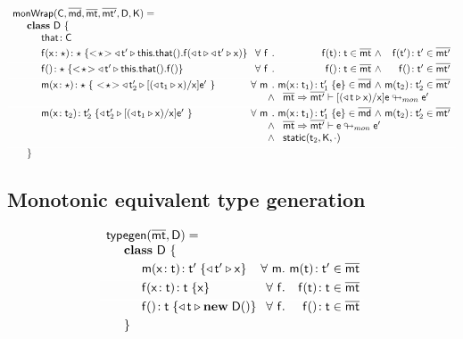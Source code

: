 \documentclass[a4paper,USenglish]{tex/lipics-v2016}
\begin{document}
\footnotesize
\[\begin{array}{l@{~}r@{}r@{~}r@{~}r@{~}rr}
\arrayrulecolor{white}
\classgen{\C, \b\md, \bmt, \bmtp, \D, \K}= \\
\SP \class~\D~\{ \\
\SPP \Fdef\that\C
\\[1mm]
\SPP \Mdef\f\x\any\any {\SubCast\any{\MonCast\tp{
      \Set{\Get\this\that}\f{\MonCast\t{\MonCast\tp\x}}}}}
&
\All f \Mtype\f\t\t\in\bmt &\wedge& \Mtype\f\tp\tp\in\bmtp
\\[1mm]\hline
\SPP \Mdefz\f\any{\SubCast\any{\MonCast\tp{\Get{\Get\this\that}\f}}}
&
 \All f \Mtype\f{}\t \in \bmt &\wedge& \Mtype\f{}\tp \in \bmtp
\\[1mm]\hline
\SPP \Mdef\m\x\any\any {~\SubCast\any{\MonCast{\tp[2]}{{[{(\MonCast{\t[1]}\x)}/\x]\ep}}}~}
&     \All \m \Mdef\m\x{\t[1]}{\tp[1]}\e\in\b\md &\wedge& \Mtype\m{\t[2]}{\tp[2]}\in\bmtp \\
&&\wedge&\multicolumn{3}{l}{\rtranstz{\bmt}\bmtp{[{(\MonCast\t\x)}/\x]\e}{\ep}}
\\[1mm]\hline
\SPP \Mdef\m\x{\t[2]}{\tp[2]} {\MonCast{\tp[2]}{[{(\MonCast{\t[1]}\x)}/\x]\ep}~}
&     \All \m \Mdef\m\x{\t[1]}{\tp[1]}\e\in\b\md &\wedge& \Mtype\m{\t[2]}{\tp[2]}\in\bmtp \\
&&\wedge&\multicolumn{3}{l}{\rtranstz{\bmt}\bmtp{\e}{\ep}} \\
&&\wedge&\multicolumn{3}{l}{\statictype{\t[2]}{\K}{\cdot}}
\\[1mm]\hline
\SP\}
\end{array}
\]
\normalsize





\subsection{Monotonic equivalent type generation}\label{typegen}

\footnotesize
\[\begin{array}{l@{~}r@{}r@{~}r@{~}r@{~}rr}
\arrayrulecolor{white}
\typegen{\bmt}{\D} = \\
\SP \class~\D~\{
\\[1mm]
\SPP \Mdef\m\x\t\tp {{\MonCast\tp{\x}}} 
&
\All m \Mtype\m\t\tp\in\bmt
\\[1mm]\hline
\SPP \Mdef\f\x\t\t {\x}
&
\All f \Mtype\f\t\t\in\bmt
\\[1mm]\hline
\SPP \Mdefz\f\t{{\MonCast\t{\New\D{}}}}
&
 \All f \Mtype\f{}\t \in \bmt
\\[1mm]
\SP\}
\end{array}
\]
\normalsize
\end{document}
